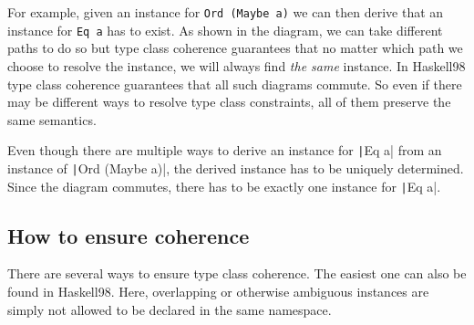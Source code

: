 For example, given an instance for \texttt{Ord (Maybe a)} we can then derive that an instance for \texttt{Eq a} has to exist.
As shown in the diagram, we can take different paths to do so but type class coherence guarantees that no matter which path we choose to resolve the instance, we will always find \emph{the same} instance.
In Haskell98 type class coherence guarantees that all such diagrams commute.
So even if there may be different ways to resolve type class constraints, all of them preserve the same semantics.


Even though there are multiple ways to derive an instance for \texttt|Eq a| from an instance of \texttt|Ord (Maybe a)|, the derived instance has to be uniquely determined.
Since the diagram commutes, there has to be exactly one instance for \texttt|Eq a|.

\subsection{How to ensure coherence}

There are several ways to ensure type class coherence.
The easiest one can also be found in Haskell98.
Here, overlapping or otherwise ambiguous instances are simply not allowed to be declared in the same namespace.

